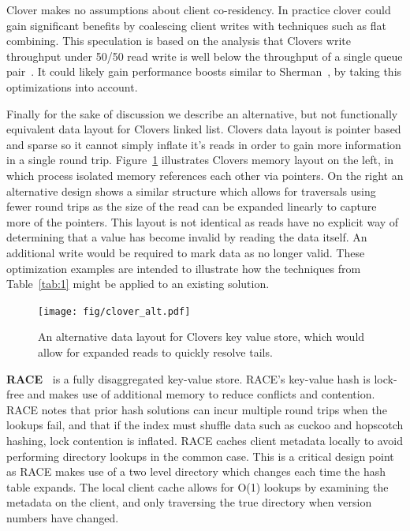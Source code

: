 Clover makes no assumptions about client co-residency. In practice clover could
gain significant benefits by coalescing client writes with techniques such as
flat combining. This speculation is based on the analysis that Clovers write
throughput under 50/50 read write is well below the throughput of a single queue
pair~\cite{design-guidelines}. It could likely gain performance boosts similar
to Sherman~\cite{sherman}, by taking this optimizations into account. 

Finally for the sake of discussion we describe an alternative, but not
functionally equivalent data layout for Clovers linked list. Clovers data layout
is pointer based and sparse so it cannot simply inflate it's reads in order to
gain more information in a single round trip. Figure~\ref{fig:clover_alt}
illustrates Clovers memory layout on the left, in which process isolated memory
references each other via pointers. On the right an alternative design shows a
similar structure which allows for traversals using fewer round trips as the
size of the read can be expanded linearly to capture more of the pointers. This
layout is not identical as reads have no explicit way of determining that a
value has become invalid by reading the data itself. An additional write would
be required to mark data as no longer valid. These optimization examples are
intended to illustrate how the techniques from Table~\ref{tab:1} might be
applied to an existing solution.

\begin{figure}
    \texttt{[image: fig/clover\_alt.pdf]}

    \caption{An alternative data layout for Clovers key value store, which would
    allow for expanded reads to quickly resolve tails.}

    \label{fig:clover_alt}
\end{figure}


\textbf{RACE~\cite{one-sided-hash}}
is a fully disaggregated key-value store. RACE's key-value hash is lock-free and
makes use of additional memory to reduce conflicts and contention. RACE notes
that prior hash solutions can incur multiple round trips when the lookups fail,
and that if the index must shuffle data such as cuckoo and hopscotch hashing,
lock contention is inflated. RACE caches client metadata locally to avoid
performing directory lookups in the common case. This is a critical design point
as RACE makes use of a two level directory which changes each time the hash
table expands. The local client cache allows for O(1) lookups by examining the
metadata on the client, and only traversing the true directory when version
numbers have changed.

